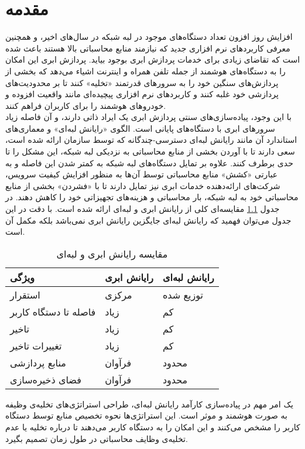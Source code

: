 \chapter{مقدمه} 
افزایش روز افزون تعداد دستگاه‌های موجود در لبه شبکه در سال‌های اخیر، و همچنین معرفی کاربردهای نرم افزاری جدید که نیازمند منابع محاسباتی بالا هستند باعث شده است که تقاضای زیادی برای خدمات پردازش ابری بوجود بیاید. پردازش ابری این امکان را به دستگاه‌های هوشمند از جمله تلفن همراه و اینترنت اشیاء می‌دهد که بخشی از پردازش‌های سنگین خود را به سرورهای قدرتمند «تخلیه» کنند تا بر محدودیت‌های پردازشی خود غلبه کنند و کاربردهای نرم افزاری پیچیده‌ای مانند واقعیت افزوده و خودروهای هوشمند را برای کاربران فراهم کنند. \\

با این وجود، پیاده‌سازی‌های سنتی پردازش ابری یک ایراد ذاتی دارند، و آن فاصله زیاد سرورهای ابری با دستگاه‌های پایانی است. الگوی «رایانش لبه‌ای» و معماری‌های استاندارد آن مانند رایانش لبه‌ای دسترسی-چندگانه که توسط سازمان  ارائه شده است، سعی دارند تا با آوردن بخشی از منابع محاسباتی به نزدیکی لبه شبکه، این مشکل را تا حدی برطرف کنند. علاوه بر تمایل دستگاه‌های لبه شبکه به کمتر شدن این فاصله و به عبارتی «کشش» منابع محاسباتی توسط آن‌ها به منظور افزایش کیفیت سرویس، شرکت‌های ارائه‌دهنده خدمات ابری نیز تمایل دارند تا با «فشردن» بخشی از منابع محاسباتی خود به لبه شبکه، بار محاسباتی و هزینه‌های تجهیزاتی خود را کاهش دهند. \cite{edgevisions} در جدول \ref{table:compare} مقایسه‌ای کلی از رایانش ابری و لبه‌ای ارائه شده است. با دقت در این جدول می‌توان فهمید که رایانش لبه‌ای جایگزین رایانش ابری نمی‌باشد بلکه مکمل آن است.
\newpage
\begin{table}[H]
	\centering
	\begin{tabular}{@{}lll@{}}
		\toprule
		ویژگی    & رایانش ابری         & رایانش لبه‌ای \\ \midrule
		استقرار          & مرکزی & توزیع شده    \\
		فاصله تا دستگاه کاربر  & زیاد        & کم            \\
		تاخیر             & زیاد        & کم            \\
		تغییرات تاخیر\footnotemark              & زیاد        & کم            \\
		منابع پردازشی & فرآوان       & محدود        \\
		فضای ذخیره‌سازی    & فرآوان       & محدود        \\ \bottomrule
	\end{tabular}
	\caption{مقایسه رایانش ابری و لبه‌ای}
	\label{table:compare}
\end{table}
یک امر مهم در پیاده‌سازی کارآمد رایانش لبه‌ای، طراحی استراتژی‌های تخلیه‌ی وظیفه به صورت هوشمند و موثر است. این استراتژی‌ها نحوه تخصیص منابع توسط دستگاه کاربر را مشخص می‌کنند و این امکان را به دستگاه کاربر می‌دهند تا درباره تخلیه یا عدم تخلیه‌ی وظایف محاسباتی در طول زمان تصمیم بگیرد. \\

